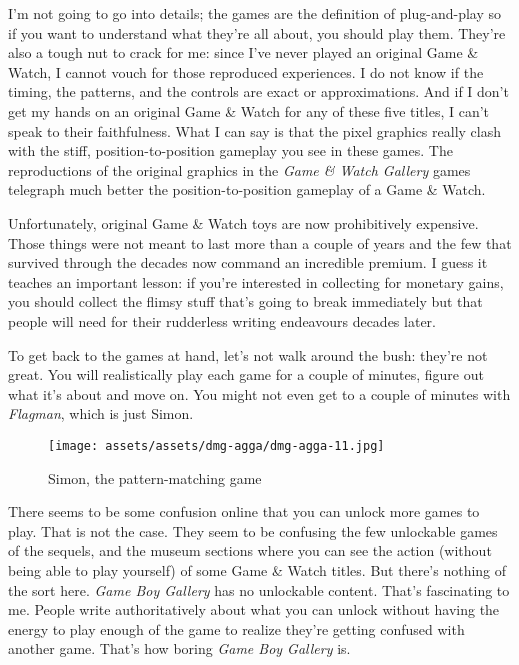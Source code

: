 \documentclass{book}
\begin{document}
I’m not going to go into details; the games are the definition of plug-and-play so if you want to understand what they’re all about, you should play them. They’re also a tough nut to crack for me: since I’ve never played an original Game \& Watch, I cannot vouch for those reproduced experiences. I do not know if the timing, the patterns, and the controls are exact or approximations. And if I don’t get my hands on an original Game \& Watch for any of these five titles, I can’t speak to their faithfulness. What I can say is that the pixel graphics really clash with the stiff, position-to-position gameplay you see in these games. The reproductions of the original graphics in the \emph{Game \& Watch Gallery} games telegraph much better the position-to-position gameplay of a Game \& Watch.

Unfortunately, original Game \& Watch toys are now prohibitively expensive. Those things were not meant to last more than a couple of years and the few that survived through the decades now command an incredible premium. I guess it teaches an important lesson: if you’re interested in collecting for monetary gains, you should collect the flimsy stuff that’s going to break immediately but that people will need for their rudderless writing endeavours decades later.

To get back to the games at hand, let’s not walk around the bush: they’re not great. You will realistically play each game for a couple of minutes, figure out what it’s about and move on. You might not even get to a couple of minutes with \emph{Flagman}, which is just Simon.

\begin{figure}[hbt]
\vskip 10pt
\centering \texttt{[image: assets/assets/dmg-agga/dmg-agga-11.jpg]}\par\pagetwodescription Simon, the pattern-matching game
\vskip 6pt
\end{figure}

There seems to be some confusion online that you can unlock more games to play. That is not the case. They seem to be confusing the few unlockable games of the sequels, and the museum sections where you can see the action (without being able to play yourself) of some Game \& Watch titles. But there’s nothing of the sort here. \emph{Game Boy Gallery} has no unlockable content. That’s fascinating to me. People write authoritatively about what you can unlock without having the energy to play enough of the game to realize they’re getting confused with another game. That’s how boring \emph{Game Boy Gallery} is.
\end{document}
